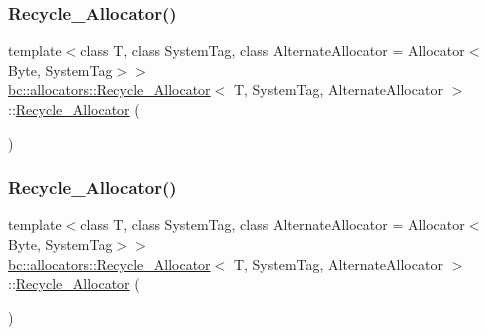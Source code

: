\mbox{\label{structbc_1_1allocators_1_1Recycle__Allocator_a171b92c4204b4bf7bf8c9ef29be4470c}} 
\subsubsection{\texorpdfstring{Recycle\+\_\+\+Allocator()}{Recycle\_Allocator()}\hspace{0.1cm}{\footnotesize\ttfamily [2/4]}}
{\footnotesize\ttfamily template$<$class T, class System\+Tag, class Alternate\+Allocator = Allocator$<$\+Byte, System\+Tag$>$$>$ \\
\hyperlink{structbc_1_1allocators_1_1Recycle__Allocator}{bc\+::allocators\+::\+Recycle\+\_\+\+Allocator}$<$ T, System\+Tag, Alternate\+Allocator $>$\+::\hyperlink{structbc_1_1allocators_1_1Recycle__Allocator}{Recycle\+\_\+\+Allocator} (\begin{DoxyParamCaption}\item[{const \hyperlink{structbc_1_1allocators_1_1Recycle__Allocator}{Recycle\+\_\+\+Allocator}$<$ T, System\+Tag, Alternate\+Allocator $>$ \&}]{ }\end{DoxyParamCaption})\hspace{0.3cm}{\ttfamily [default]}}

\mbox{\label{structbc_1_1allocators_1_1Recycle__Allocator_a330dbed300aa0dc5d67fa5974efec666}} 
\subsubsection{\texorpdfstring{Recycle\+\_\+\+Allocator()}{Recycle\_Allocator()}\hspace{0.1cm}{\footnotesize\ttfamily [3/4]}}
{\footnotesize\ttfamily template$<$class T, class System\+Tag, class Alternate\+Allocator = Allocator$<$\+Byte, System\+Tag$>$$>$ \\
\hyperlink{structbc_1_1allocators_1_1Recycle__Allocator}{bc\+::allocators\+::\+Recycle\+\_\+\+Allocator}$<$ T, System\+Tag, Alternate\+Allocator $>$\+::\hyperlink{structbc_1_1allocators_1_1Recycle__Allocator}{Recycle\+\_\+\+Allocator} (\begin{DoxyParamCaption}\item[{\hyperlink{structbc_1_1allocators_1_1Recycle__Allocator}{Recycle\+\_\+\+Allocator}$<$ T, System\+Tag, Alternate\+Allocator $>$ \&\&}]{ }\end{DoxyParamCaption})\hspace{0.3cm}{\ttfamily [default]}}

